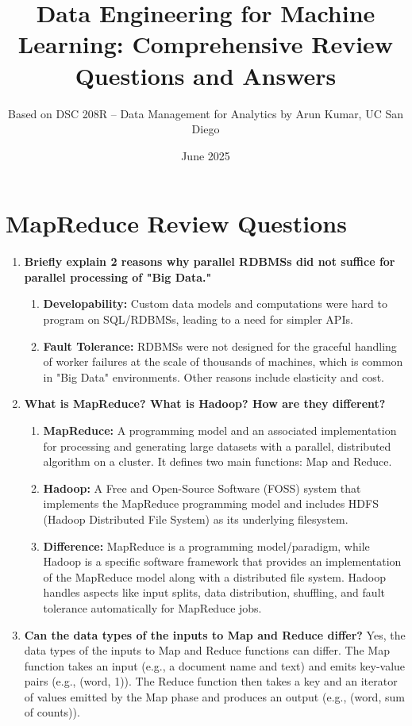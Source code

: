 \documentclass{article}
\title{Data Engineering for Machine Learning: Comprehensive Review Questions and Answers}
\author{Based on DSC 208R – Data Management for Analytics by Arun Kumar, UC San Diego}
\date{June 2025}
\begin{document}
\maketitle

\section*{MapReduce Review Questions}

\begin{enumerate}
    \item \textbf{Briefly explain 2 reasons why parallel RDBMSs did not suffice for parallel processing of "Big Data."}
    \begin{enumerate}[label=\alph*)]
        \item \textbf{Developability:} Custom data models and computations were hard to program on SQL/RDBMSs, leading to a need for simpler APIs.
        \item \textbf{Fault Tolerance:} RDBMSs were not designed for the graceful handling of worker failures at the scale of thousands of machines, which is common in "Big Data" environments. Other reasons include elasticity and cost.
    \end{enumerate}

    \item \textbf{What is MapReduce? What is Hadoop? How are they different?}
    \begin{enumerate}[label=\alph*)]
        \item \textbf{MapReduce:} A programming model and an associated implementation for processing and generating large datasets with a parallel, distributed algorithm on a cluster. It defines two main functions: Map and Reduce.
        \item \textbf{Hadoop:} A Free and Open-Source Software (FOSS) system that implements the MapReduce programming model and includes HDFS (Hadoop Distributed File System) as its underlying filesystem.
        \item \textbf{Difference:} MapReduce is a programming model/paradigm, while Hadoop is a specific software framework that provides an implementation of the MapReduce model along with a distributed file system. Hadoop handles aspects like input splits, data distribution, shuffling, and fault tolerance automatically for MapReduce jobs.
    \end{enumerate}

    \item \textbf{Can the data types of the inputs to Map and Reduce differ?}
    Yes, the data types of the inputs to Map and Reduce functions can differ. The Map function takes an input (e.g., a document name and text) and emits key-value pairs (e.g., (word, 1)). The Reduce function then takes a key and an iterator of values emitted by the Map phase and produces an output (e.g., (word, sum of counts)).


\end{enumerate}
\end{document}
